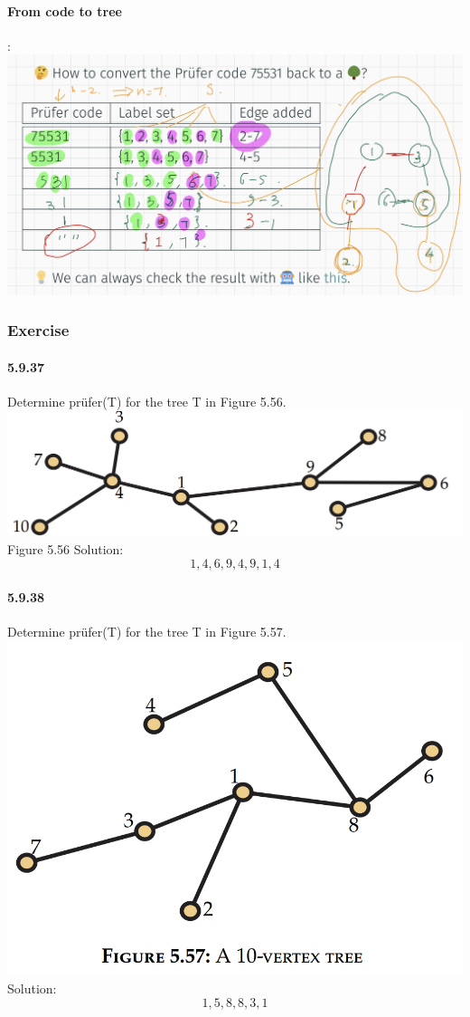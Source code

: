 \documentclass{article}
\begin{document}
\paragraph{From code to tree}:\newline
\includegraphics{0065}
\subsubsection{Exercise}
\paragraph{5.9.37}
Determine prüfer(T) for the tree T in Figure 5.56.\newline
\includegraphics{0071}\newline
Figure 5.56\newline
Solution:\newline
$$1,4,6,9,4,9,1,4$$
\paragraph{5.9.38}
Determine prüfer(T) for the tree T in Figure 5.57.\newline
\includegraphics{0072}\newline
Solution:\newline
$$1,5,8,8,3,1$$
\end{document}
